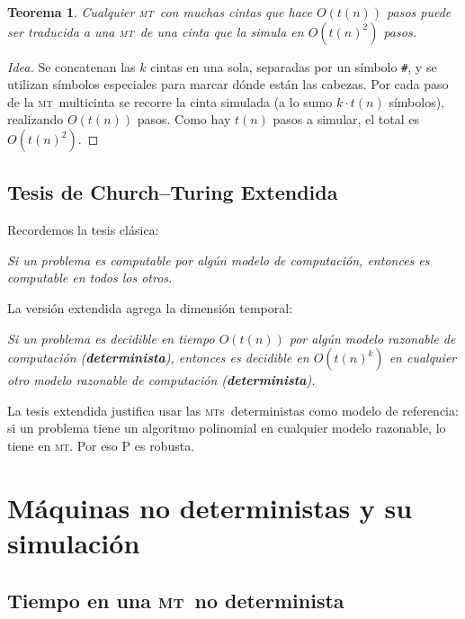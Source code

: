 \documentclass[11pt,a4paper]{article}
\theoremstyle{definicion}
\newtheorem{teorema}[definicion]{Teorema}
\newcommand{\MT}{\textsc{mt}}
\newcommand{\MTs}{\textsc{mt}s}
\newcommand{\Pclass}{\mathrm{P}}
\begin{document}
\begin{teorema}
Cualquier \MT\ con muchas cintas que hace $O(t(n))$ pasos puede ser traducida a una \MT\ de una cinta que la simula en $O(t(n)^2)$ pasos.
\end{teorema}

\begin{proof}[Idea]
Se concatenan las $k$ cintas en una sola, separadas por un s\'imbolo \texttt{\#}, y se utilizan s\'imbolos especiales para marcar d\'onde est\'an las cabezas. Por cada paso de la \MT\ multicinta se recorre la cinta simulada (a lo sumo $k \cdot t(n)$ s\'imbolos), realizando $O(t(n))$ pasos. Como hay $t(n)$ pasos a simular, el total es $O(t(n)^2)$.
\end{proof}

\subsection{Tesis de Church--Turing Extendida}

Recordemos la tesis cl\'asica:

\begin{center}
\emph{Si un problema es computable por alg\'un modelo de computaci\'on, entonces es computable en todos los otros.}
\end{center}

La versi\'on extendida agrega la dimensi\'on temporal:

\begin{center}
\emph{Si un problema es decidible en tiempo $O(t(n))$ por alg\'un modelo razonable de computaci\'on (\textbf{determinista}), entonces es decidible en $O(t(n)^k)$ en cualquier otro modelo razonable de computaci\'on (\textbf{determinista}).}
\end{center}

\begin{idea}
La tesis extendida justifica usar las \MTs\ deterministas como modelo de referencia: si un problema tiene un algoritmo polinomial en cualquier modelo razonable, lo tiene en \MT. Por eso $\Pclass$ es robusta.
\end{idea}

\section{M\'aquinas no deterministas y su simulaci\'on}

\subsection{Tiempo en una \MT\ no determinista}
\end{document}
